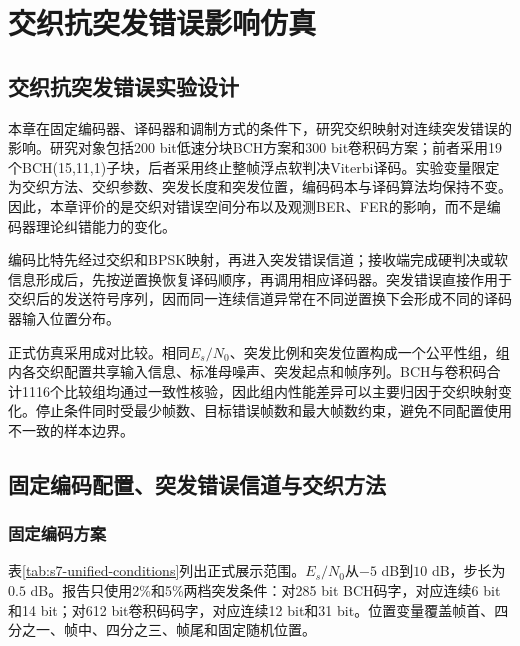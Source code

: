 \chapter{交织抗突发错误影响仿真}\label{chap:interleaving}
\captionsetup{font=small,labelfont=normalfont,skip=0.6em}

\section{交织抗突发错误实验设计}

本章在固定编码器、译码器和调制方式的条件下，研究交织映射对连续突发错误的影响。研究对象包括200 bit低速分块BCH方案和300 bit卷积码方案；前者采用19个BCH(15,11,1)子块，后者采用终止整帧浮点软判决Viterbi译码。实验变量限定为交织方法、交织参数、突发长度和突发位置，编码码本与译码算法均保持不变。因此，本章评价的是交织对错误空间分布以及观测BER、FER的影响，而不是编码器理论纠错能力的变化。

编码比特先经过交织和BPSK映射，再进入突发错误信道；接收端完成硬判决或软信息形成后，先按逆置换恢复译码顺序，再调用相应译码器。突发错误直接作用于交织后的发送符号序列，因而同一连续信道异常在不同逆置换下会形成不同的译码器输入位置分布。

正式仿真采用成对比较。相同$E_s/N_0$、突发比例和突发位置构成一个公平性组，组内各交织配置共享输入信息、标准母噪声、突发起点和帧序列。BCH与卷积码合计1116个比较组均通过一致性核验，因此组内性能差异可以主要归因于交织映射变化。停止条件同时受最少帧数、目标错误帧数和最大帧数约束，避免不同配置使用不一致的样本边界。

\section{固定编码配置、突发错误信道与交织方法}

\subsection{固定编码方案}

表\ref{tab:s7-unified-conditions}列出正式展示范围。$E_s/N_0$从$-5$ dB到$10$ dB，步长为$0.5$ dB。报告只使用2\%和5\%两档突发条件：对285 bit BCH码字，对应连续6 bit和14 bit；对612 bit卷积码码字，对应连续12 bit和31 bit。位置变量覆盖帧首、四分之一、帧中、四分之三、帧尾和固定随机位置。

